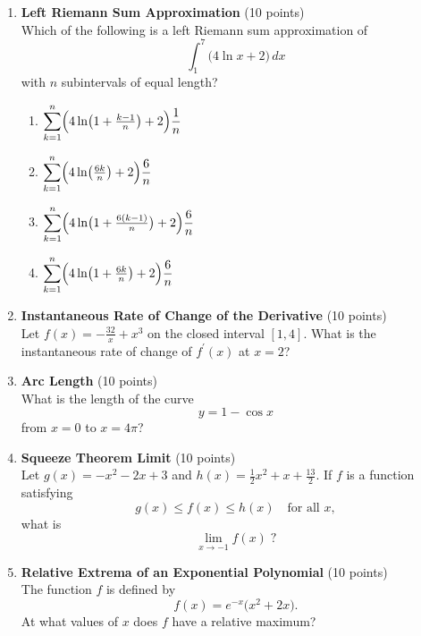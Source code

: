 \begin{enumerate}
  \item \textbf{Left Riemann Sum Approximation} (10 points)\\
  Which of the following is a left Riemann sum approximation of
  \[
    \int_1^7\bigl(4 \ln x + 2\bigr)\,dx
  \]
  with $n$ subintervals of equal length?
  \begin{enumerate}[label=(\Alph*)]
    \item $\displaystyle \sum_{k=1}^n\Bigl(4 \ln\bigl(1+\tfrac{k-1}{n}\bigr)+2\Bigr)\frac{1}{n}$
    \item $\displaystyle \sum_{k=1}^n\Bigl(4 \ln\bigl(\tfrac{6k}{n}\bigr)+2\Bigr)\frac{6}{n}$
    \item $\displaystyle \sum_{k=1}^n\Bigl(4 \ln\bigl(1+\tfrac{6(k-1)}{n}\bigr)+2\Bigr)\frac{6}{n}$
    \item $\displaystyle \sum_{k=1}^n\Bigl(4 \ln\bigl(1+\tfrac{6k}{n}\bigr)+2\Bigr)\frac{6}{n}$
  \end{enumerate}
  \begin{subanswer}
  \end{subanswer}

  \item \textbf{Instantaneous Rate of Change of the Derivative} (10 points)\\
  Let $f(x)=-\frac{32}{x}+x^3$ on the closed interval $[1,4]$. What is the instantaneous rate of change of $f^{\prime}(x)$ at $x=2$?
  \begin{subanswer}
  \end{subanswer}

  \item \textbf{Arc Length} (10 points)\\
  What is the length of the curve
  \[
    y = 1 - \cos x
  \]
  from $x=0$ to $x=4\pi$?
  \begin{subanswer}
  \end{subanswer}

  \item \textbf{Squeeze Theorem Limit} (10 points)\\
  Let $g(x)=-x^2-2x+3$ and $h(x)=\tfrac{1}{2}x^2 + x + \tfrac{13}{2}$. If $f$ is a function satisfying
  \[
    g(x) \le f(x) \le h(x)
    \quad\text{for all }x,
  \]
  what is
  \[
    \lim_{x\to -1} f(x)\;?
  \]
  \begin{subanswer}
  \end{subanswer}

  \item \textbf{Relative Extrema of an Exponential Polynomial} (10 points)\\
  The function $f$ is defined by
  \[
    f(x)=e^{-x}\bigl(x^2+2x\bigr).
  \]
  At what values of $x$ does $f$ have a relative maximum?
  \begin{subanswer}
  \end{subanswer}


\end{enumerate}
